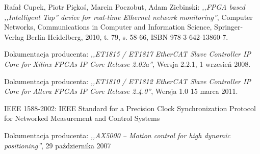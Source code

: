 \begin{thebibliography}{99}
Rafał Cupek, Piotr Piękoś, Marcin Poczobut, Adam Ziebinski:
\emph{,,FPGA based ,,Intelligent Tap'' device for real-time Ethernet network monitoring''},
Computer Networks, Communications in Computer and Information Science, Springer-Verlag Berlin Heidelberg,
2010,
t. 79, s. 58-66,
ISBN 978-3-642-13860-7.

Dokumentacja producenta: 
\emph{,,ET1815 / ET1817 EtherCAT Slave Controller IP Core for Xilinx FPGAs IP Core Release 2.02a''}, 
Wersja 2.2.1,
1 wrzesień 2008.

Dokumentacja producenta: 
\emph{,,ET1810 / ET1812 EtherCAT Slave Controller IP Core for Altera FPGAs IP Core Release 2.4.0''}, 
Wersja 1.0
15 marca 2011.

IEEE 1588-2002: IEEE Standard for a Precision Clock Synchronization Protocol for Networked Measurement and Control Systems

Dokumentacja producenta: 
\emph{,,AX5000 – Motion control for high dynamic positioning''},
29 października 2007

\end{thebibliography}